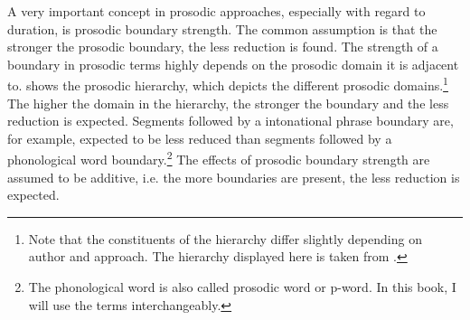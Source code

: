 


A very important concept in prosodic approaches, especially with regard to duration, is prosodic boundary strength. The common assumption is that the stronger the prosodic boundary, the less reduction is found. The strength of a boundary in prosodic terms highly depends on the prosodic domain it is adjacent to.
 shows the prosodic hierarchy, which depicts the different prosodic domains.\footnote{Note that the constituents of the hierarchy differ slightly depending on author and approach. The hierarchy displayed here is taken from \citet[9]{Hall.2001}.} 
The higher the domain in the hierarchy, the stronger the boundary and the less reduction is expected. Segments followed by a intonational phrase boundary are, for example, expected to be less reduced than segments followed by a {phonological word} boundary.\footnote{The phonological word is also called prosodic word or p-word. In this book, I will use the terms interchangeably.}
 The effects of prosodic boundary strength are assumed to be additive, i.e. the more boundaries are present, the less reduction is expected. %


